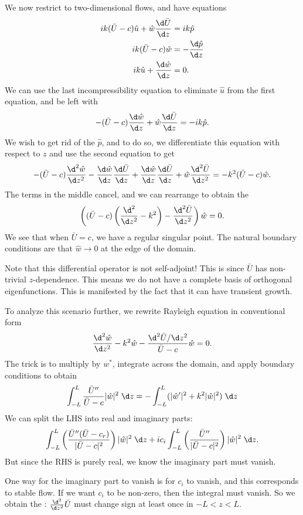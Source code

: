 \documentclass[a4paper]{article}
\begin{document}
We now restrict to two-dimensional flows, and have equations
\begin{align*}
  ik (\bar{U} - c) \hat{u} + \hat{w} \frac{\d \bar{U}}{\d z} &= ik\hat{p}\\
  ik (\bar{U} - c) \hat{w} &= - \frac{\d \hat{p}}{\d z}\\
  ik \hat{u} + \frac{\d \hat{w}}{\d z} &= 0.
\end{align*}
We can use the last incompressibility equation to eliminate $\hat{u}$ from the first equation, and be left with
\[
  -(\bar{U} - c) \frac{\d \hat{w}}{\d z} + \hat{w} \frac{\d \bar{U}}{\d z} = - ik \hat{p}.
\]
We wish to get rid of the $\hat{p}$, and to do so, we differentiate this equation with respect to $z$ and use the second equation to get
\[
  -(\bar{U} - c) \frac{\d^2 \hat{w}}{\d z^2} - \frac{\d \hat{w}}{\d z} \frac{\d \bar{U}}{\d z} + \frac{\d \hat{w}}{\d z} \frac{\d \bar{U}}{\d z} + \hat{w} \frac{\d^2 \bar{U}}{\d z^2} = -k^2 (\bar{U} - c) \hat{w}.
\]
The terms in the middle cancel, and we can rearrange to obtain the 
\[
  \left((\bar{U} - c) \left(\frac{\d^2}{\d z^2} - k^2\right) - \frac{\d^2 \bar{U}}{\d z^2} \right) \hat{w} = 0.
\]
We see that when $\bar{U} = c$, we have a regular singular point. The natural boundary conditions are that $\hat{w} \to 0$ at the edge of the domain.

Note that this differential operator is not self-adjoint! This is since $\bar{U}$ has non-trivial $z$-dependence. This means we do not have a complete basis of orthogonal eigenfunctions. This is manifested by the fact that it can have transient growth.

To analyze this scenario further, we rewrite Rayleigh equation in conventional form
\[
  \frac{\d^2 \hat{w}}{\d z^2} - k^2 \hat{w} - \frac{\d^2 \bar{U}/\d z^2}{\bar{U} - c} \hat{w} = 0.
\]
The trick is to multiply by $w^*$, integrate across the domain, and apply boundary conditions to obtain
\[
  \int_{-L}^L \frac{\bar{U}''}{\bar{U} - c} |\hat{w}|^2 \;\d z = - \int_{-L}^L (|\hat{w}'|^2 + k^2 |\hat{w}|^2)\;\d z
\]
We can split the LHS into real and imaginary parts:
\[
  \int_{-L}^L \left( \frac{\bar{U}''(\bar{U} - c_r)}{|\bar{U} - c|^2}\right) |\hat{w}|^2 \;\d z + i c_i \int_{-L}^L \left(\frac{\bar{U}''}{ |\bar{U} - c|^2}\right) |\hat{w}|^2 \;\d z.
\]
But since the RHS is purely real, we know the imaginary part must vanish.

One way for the imaginary part to vanish is for $c_i$ to vanish, and this corresponds to stable flow. If we want $c_i$ to be non-zero, then the integral must vanish. So we obtain the : $\frac{\d^2}{\d z^2} \bar{U}$ must change sign at least once in $-L < z < L$.
\end{document}
